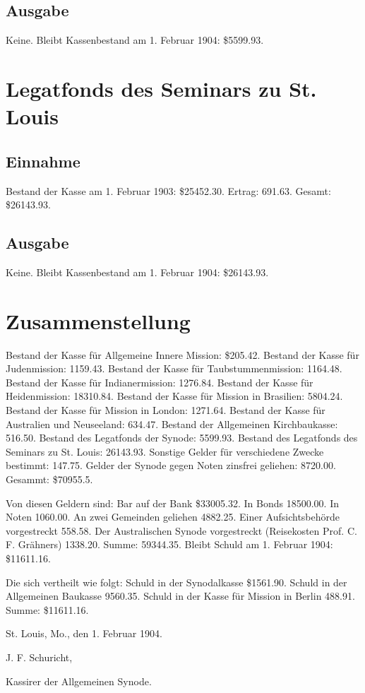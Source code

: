 \subsection{Ausgabe}

Keine. Bleibt Kassenbestand am 1. Februar 1904: \$5599.93.

\section{Legatfonds des Seminars zu St. Louis}

\subsection{Einnahme}

Bestand der Kasse am 1. Februar 1903: \$25452.30. Ertrag: 691.63. Gesamt: \$26143.93.

\subsection{Ausgabe}

Keine. Bleibt Kassenbestand am 1. Februar 1904: \$26143.93.

\section{Zusammenstellung}

Bestand der Kasse für Allgemeine Innere Mission: \$205.42. Bestand der Kasse für Judenmission: 1159.43. Bestand der Kasse für Taubstummenmission: 1164.48. Bestand der Kasse für Indianermission: 1276.84. Bestand der Kasse für Heidenmission: 18310.84. Bestand der Kasse für Mission in Brasilien: 5804.24. Bestand der Kasse für Mission in London: 1271.64. Bestand der Kasse für Australien und Neuseeland: 634.47. Bestand der Allgemeinen Kirchbaukasse: 516.50. Bestand des Legatfonds der Synode: 5599.93. Bestand des Legatfonds des Seminars zu St. Louis: 26143.93. Sonstige Gelder für verschiedene Zwecke bestimmt: 147.75. Gelder der Synode gegen Noten zinsfrei geliehen: 8720.00. Gesammt: \$70955.5.

Von diesen Geldern sind: Bar auf der Bank \$33005.32. In Bonds 18500.00. In Noten 1060.00. An zwei Gemeinden geliehen 4882.25. Einer Aufsichtsbehörde vorgestreckt 558.58. Der Australischen Synode vorgestreckt (Reisekosten Prof. C. F. Grähners) 1338.20. Summe: 59344.35. Bleibt Schuld am 1. Februar 1904: \$11611.16.

Die sich vertheilt wie folgt: Schuld in der Synodalkasse \$1561.90. Schuld in der Allgemeinen Baukasse 9560.35. Schuld in der Kasse für Mission in Berlin 488.91. Summe: \$11611.16.

St. Louis, Mo., den 1. Februar 1904.

J. F. Schuricht,

Kassirer der Allgemeinen Synode.
